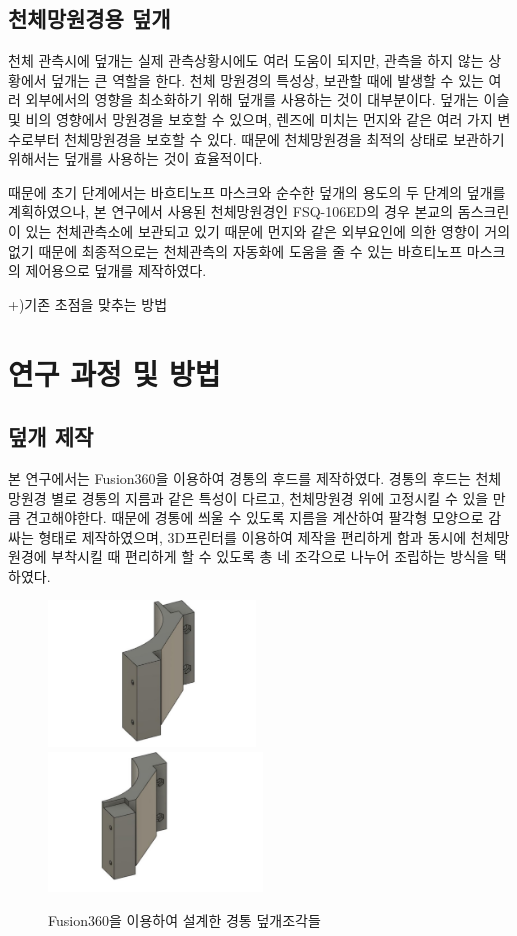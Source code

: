 \documentclass[twoside,11pt]{gshs_thesis}
\begin{document}
\subsection{천체망원경용 덮개}

천체 관측시에 덮개는 실제 관측상황시에도 여러 도움이 되지만, 관측을 하지 않는 상황에서 덮개는 큰 역할을 한다. 천체 망원경의 특성상, 보관할 때에 발생할 수 있는 여러 외부에서의 영향을 최소화하기 위해 덮개를 사용하는 것이 대부분이다. 덮개는 이슬 및 비의 영향에서 망원경을 보호할 수 있으며, 렌즈에 미치는 먼지와 같은 여러 가지 변수로부터 천체망원경을 보호할 수 있다. 때문에 천체망원경을 최적의 상태로 보관하기 위해서는 덮개를 사용하는 것이 효율적이다. 

때문에 초기 단계에서는 바흐티노프 마스크와 순수한 덮개의 용도의 두 단계의 덮개를 계획하였으나, 본 연구에서 사용된 천체망원경인 FSQ-106ED의 경우 본교의 돔스크린이 있는 천체관측소에 보관되고 있기 때문에 먼지와 같은 외부요인에 의한 영향이 거의 없기 때문에 최종적으로는 천체관측의 자동화에 도움을 줄 수 있는 바흐티노프 마스크의 제어용으로 덮개를 제작하였다.

+)기존 초점을 맞추는 방법

\newpage
\section{연구 과정 및 방법}
\subsection{덮개 제작}
 본 연구에서는 Fusion360을 이용하여 경통의 후드를 제작하였다. 경통의 후드는 천체망원경 별로 경통의 지름과 같은 특성이 다르고, 천체망원경 위에 고정시킬 수 있을 만큼 견고해야한다. 때문에 경통에 씌울 수 있도록 지름을 계산하여 팔각형 모양으로 감싸는 형태로 제작하였으며, 3D프린터를 이용하여 제작을 편리하게 함과 동시에 천체망원경에 부착시킬 때 편리하게 할 수 있도록 총 네 조각으로 나누어 조립하는 방식을 택하였다.
 
\bigskip
\bigskip
\begin{figure}[h]
	\begin{center}
			\includegraphics[width = 5.5cm]{coverpeice1}
			\includegraphics[width = 5.7cm]{coverpeice2}
	\end{center}
	\caption{Fusion360을 이용하여 설계한 경통 덮개조각들}
	\label{coverpeice}
\end{figure}
\end{document}
